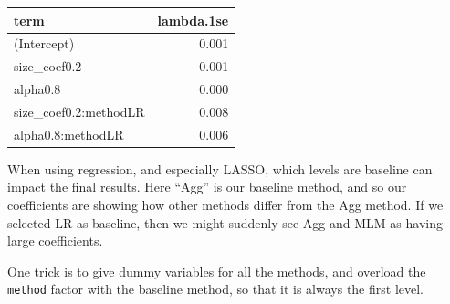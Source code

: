 \documentclass[
]{book}
\newenvironment{Shaded}{\begin{snugshade}}{\end{snugshade}}
\newcommand{\ControlFlowTok}[1]{\textcolor[rgb]{0.13,0.29,0.53}{\textbf{#1}}}
\newcommand{\DecValTok}[1]{\textcolor[rgb]{0.00,0.00,0.81}{#1}}
\newcommand{\FunctionTok}[1]{\textcolor[rgb]{0.13,0.29,0.53}{\textbf{#1}}}
\newcommand{\NormalTok}[1]{#1}
\newcommand{\OtherTok}[1]{\textcolor[rgb]{0.56,0.35,0.01}{#1}}
\newcommand{\SpecialCharTok}[1]{\textcolor[rgb]{0.81,0.36,0.00}{\textbf{#1}}}
\newcommand{\StringTok}[1]{\textcolor[rgb]{0.31,0.60,0.02}{#1}}
\begin{document}
\begin{tabular}{l|r}
\hline
term & lambda.1se\\
\hline
(Intercept) & 0.001\\
\hline
size\_coef0.2 & 0.001\\
\hline
alpha0.8 & 0.000\\
\hline
size\_coef0.2:methodLR & 0.008\\
\hline
alpha0.8:methodLR & 0.006\\
\hline
\end{tabular}

When using regression, and especially LASSO, which levels are baseline can impact the final results.
Here ``Agg'' is our baseline method, and so our coefficients are showing how other methods differ from the Agg method.
If we selected LR as baseline, then we might suddenly see Agg and MLM as having large coefficients.

One trick is to give dummy variables for all the methods, and overload the \texttt{method} factor with the baseline method, so that it is always the first level.

\begin{Shaded}
\end{Shaded}
\end{document}
